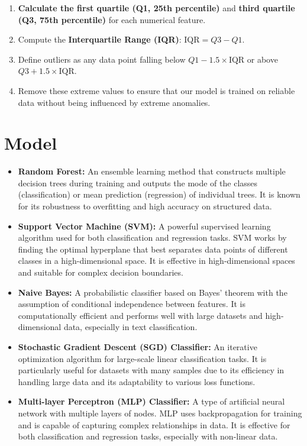 \documentclass{article}
\begin{document}
\begin{enumerate}
    \item \textbf{Calculate the first quartile (Q1, 25th percentile)} and \textbf{third quartile (Q3, 75th percentile)} for each numerical feature.
    \item Compute the \textbf{Interquartile Range (IQR)}: \( \text{IQR} = Q3 - Q1 \).
    \item Define outliers as any data point falling below \( Q1 - 1.5 \times \text{IQR} \) or above \( Q3 + 1.5 \times \text{IQR} \).
    \item Remove these extreme values to ensure that our model is trained on reliable data without being influenced by extreme anomalies.
\end{enumerate}


\section{Model}


\begin{itemize}
    \item \textbf{Random Forest:} An ensemble learning method that constructs multiple decision trees during training and outputs the mode of the classes (classification) or mean prediction (regression) of individual trees. It is known for its robustness to overfitting and high accuracy on structured data.

    \item \textbf{Support Vector Machine (SVM):} A powerful supervised learning algorithm used for both classification and regression tasks. SVM works by finding the optimal hyperplane that best separates data points of different classes in a high-dimensional space. It is effective in high-dimensional spaces and suitable for complex decision boundaries.

    \item \textbf{Naive Bayes:} A probabilistic classifier based on Bayes' theorem with the assumption of conditional independence between features. It is computationally efficient and performs well with large datasets and high-dimensional data, especially in text classification.

    \item \textbf{Stochastic Gradient Descent (SGD) Classifier:} An iterative optimization algorithm for large-scale linear classification tasks. It is particularly useful for datasets with many samples due to its efficiency in handling large data and its adaptability to various loss functions.

    \item \textbf{Multi-layer Perceptron (MLP) Classifier:} A type of artificial neural network with multiple layers of nodes. MLP uses backpropagation for training and is capable of capturing complex relationships in data. It is effective for both classification and regression tasks, especially with non-linear data.
\end{itemize}
\end{document}

